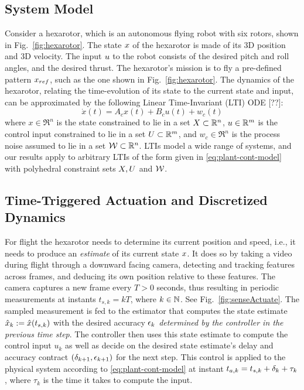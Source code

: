 \subsection{System Model}
\label{formulation}

Consider a hexarotor, which is an autonomous flying robot with six rotors, shown in Fig.~\ref{fig:hexarotor}.
The state $x$ of the hexarotor is made of its 3D position and 3D velocity.
The input $u$ to the robot consists of the desired pitch and roll angles, and the desired thrust.
The hexarotor's mission is to fly a pre-defined pattern $x_{ref}$, such as the one shown in Fig.~\ref{fig:hexarotor}.
The dynamics of the hexarotor, relating the time-evolution of its state to the current state and input, can be approximated by the following Linear Time-Invariant (LTI) ODE [??]:
\begin{equation}
\dot{x}(t) = A_{c}x(t)+B_{c}u(t)+w_{c}(t)  \label{eq:plant-cont-model}
\end{equation}
where $x\in \Re^{n}$ is the state constrained to lie in a set $X \subset \mathbb{R}^n$, 
$u\in\mathbb{R}^{m}$ is the control input constrained to lie in a set $U \subset \mathbb{R}^m$,
and $w_{c}\in\Re^{n}$ is the process noise assumed to lie in a set $\mathcal{W} \subset \mathbb{R}^n$. 
LTIs model a wide range of systems, and our results apply to arbitrary LTIs of the form given in \eqref{eq:plant-cont-model} with polyhedral constraint sets $X,U$ and $\mathcal{W}$.

\subsection{Time-Triggered Actuation and Discretized Dynamics}
For flight the hexarotor needs to determine its current position and speed, i.e., it needs to produce an \emph{estimate} of its current state $x$.
It does so by taking a video during flight through a downward facing camera, detecting and tracking features across frames, and deducing its own position relative to these features.
The camera captures a new frame every $T > 0$ seconds, thus resulting in periodic measurements at instants $t_{s,k}=kT$,
where $k\in\mathbb{N}$.
See Fig.~\ref{fig:senseActuate}.
The sampled measurement is fed to the estimator that computes the state
estimate $\hat{x}_{k}:=\hat{x}(t_{s,k})$ with the desired
accuracy $\epsilon_k$ \emph{determined by the controller in the previous time step}. 
The controller then uses this state estimate
to compute the control input $u_{k}$ as well as decide on the desired
state estimate's delay and accuracy contract $(\delta_{k+1},\epsilon_{k+1})$ for the next step. 
This control is applied to the physical system according to \eqref{eq:plant-cont-model} at instant $t_{a,k} = t_{s,k}+\delta_k + \tau_k$, where $\tau_k$ is the time it takes to compute the input. 

